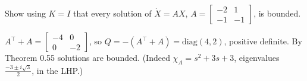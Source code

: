 \begin{qbox}[title={Q5.4 (Lyapunov)}]
Show using $K=I$ that every solution of $\dot X=AX$, $A=\begin{bmatrix}-2&1\\-1&-1\end{bmatrix}$, is bounded.
\end{qbox}
\begin{solbox}
$A^\top+A=\begin{bmatrix}-4&0\\0&-2\end{bmatrix}$, so $Q=-(A^\top+A)=\mathrm{diag}(4,2)$, positive definite. By Theorem 0.55 solutions are bounded.
(Indeed $\chi_A=s^2+3s+3$, eigenvalues $\frac{-3\pm i\sqrt3}{2}$, in the LHP.)
\end{solbox}
\newpage
